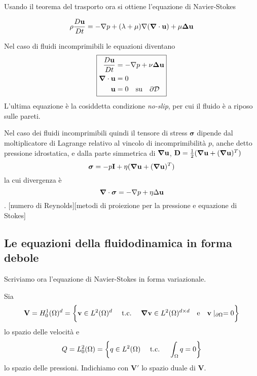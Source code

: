 Usando il teorema del trasporto ora si ottiene l'equazione di Navier-Stokes

$$\rho \frac{D\mathbf{u}}{Dt} = -\nabla p + (\lambda+\mu) \nabla(\boldsymbol{\nabla} \cdot \mathbf{u}) + \mu \boldsymbol{\Delta} \mathbf{u}$$

Nel caso di fluidi incomprimibili le equazioni diventano
\begin{equation}
\boxed{
\begin{aligned}
\frac{D\mathbf{u}}{Dt} &= - \nabla p + \nu \boldsymbol{\Delta} \mathbf{u} \\
\boldsymbol{\nabla} \cdot  \mathbf{u} &= 0 \\
\mathbf{u} &= 0 \quad \text{su} \quad \partial \mathcal{D}
\end{aligned}
}
\end{equation}
L'ultima equazione è la cosiddetta condizione \emph{no-slip}, per cui il fluido è a riposo sulle pareti.

Nel caso dei fluidi incomprimibili quindi il tensore di stress $\boldsymbol{\sigma}$ dipende dal moltiplicatore di Lagrange relativo al vincolo di incomprimibilità $p$, anche detto pressione idrostatica, e dalla parte simmetrica di $\boldsymbol{\nabla}\mathbf{u}$, $\mathbf{D}=\frac{1}{2}(\boldsymbol{\nabla}\mathbf{u}+(\boldsymbol{\nabla}\mathbf{u})^{T})$
$$\boldsymbol{\sigma}=-p\mathbf{I}+\eta(\boldsymbol{\nabla}\mathbf{u}+(\boldsymbol{\nabla}\mathbf{u})^{T})$$
la cui divergenza è
$$\boldsymbol{\nabla}\cdot\boldsymbol{\sigma}=-\nabla p+\eta\Delta\mathbf{u}$$.
[numero di Reynolds][metodi di proiezione per la pressione e equazione di Stokes]

\subsection{Le equazioni della fluidodinamica in forma debole}
Scriviamo ora l'equazione di Navier-Stokes in forma variazionale.

Sia
\begin{equation*}
\mathbf{V} = H^1_0(\Omega)^d = \bigg \{ \mathbf{v} \in L^2(\Omega)^d \quad \ \text{t.c.}\  \quad \boldsymbol{\nabla} \mathbf{v} \in L^2(\Omega)^{d \times d} \quad \text{e} \quad \mathbf{v}\mid_{\partial \Omega} = 0 \bigg \}
\end{equation*}
lo spazio delle velocità e 
\begin{equation*}
Q = L^2_0(\Omega) = \left  \{ q \in L^2(\Omega) \quad \ \text{t.c.}\  \quad \int_{\Omega}q=0 \right  \}
\end{equation*}
lo spazio delle pressioni. Indichiamo con $\mathbf{V}'$ lo spazio duale di $\mathbf{V}$.


